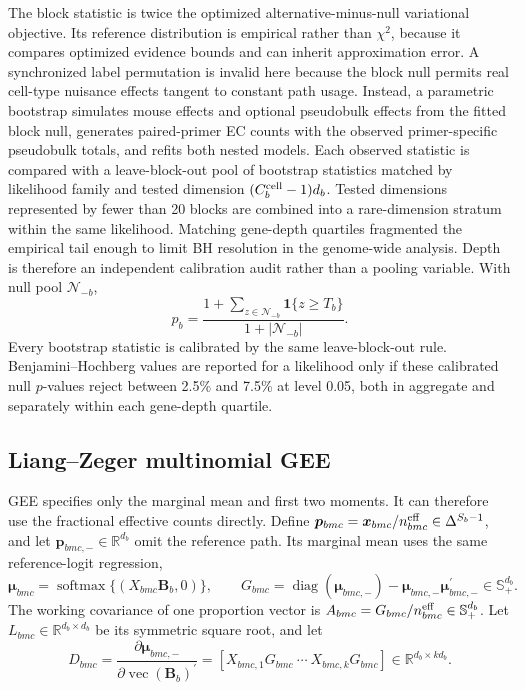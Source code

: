 \documentclass[11pt]{article}
\newcommand{\Beta}{\bm B}
\begin{document}
The block statistic is twice the optimized alternative-minus-null variational objective. Its reference distribution is empirical rather than \(\chi^2\), because it compares optimized evidence bounds and can inherit approximation error. A synchronized label permutation is invalid here because the block null permits real cell-type nuisance effects tangent to constant path usage. Instead, a parametric bootstrap simulates mouse effects and optional pseudobulk effects from the fitted block null, generates paired-primer EC counts with the observed primer-specific pseudobulk totals, and refits both nested models. Each observed statistic is compared with a leave-block-out pool of bootstrap statistics matched by likelihood family and tested dimension \((C_b^{\rm cell}-1)d_b\). Tested dimensions represented by fewer than 20 blocks are combined into a rare-dimension stratum within the same likelihood. Matching gene-depth quartiles fragmented the empirical tail enough to limit BH resolution in the genome-wide analysis. Depth is therefore an independent calibration audit rather than a pooling variable. With null pool \(\mathcal N_{-b}\), \[
 p_b=\frac{1+\sum_{z\in\mathcal N_{-b}}
                   \mathbf1\{z\geq T_b\}}
              {1+|\mathcal N_{-b}|}.
\]
Every bootstrap statistic is calibrated by the same leave-block-out rule. Benjamini--Hochberg values are reported for a likelihood only if these calibrated null \(p\)-values reject between 2.5\% and 7.5\% at level 0.05, both in aggregate and separately within each gene-depth quartile.

\subsection*{Liang--Zeger multinomial GEE}

GEE specifies only the marginal mean and first two moments. It can therefore use the fractional effective counts directly. Define \(\bm p_{bmc}=\bm x_{bmc}/n_{bmc}^{\rm eff}\in\Delta^{S_b-1}\), and let \(\bm p_{bmc,-}\in\mathbb R^{d_b}\) omit the reference path. Its marginal mean uses the same reference-logit regression, \[
 \bm\mu_{bmc}=\operatorname{softmax}\{(X_{bmc}\Beta_b,0)\},
 \qquad
 G_{bmc}=\operatorname{diag}(\bm\mu_{bmc,-})
 -\bm\mu_{bmc,-}\bm\mu_{bmc,-}^\prime
 \in\mathbb S_+^{d_b}.
\]
The working covariance of one proportion vector is \(A_{bmc}=G_{bmc}/n_{bmc}^{\rm eff}\in\mathbb S_+^{d_b}\). Let \(L_{bmc}\in\mathbb R^{d_b\times d_b}\) be its symmetric square root, and let \[
 D_{bmc}=\frac{\partial\bm\mu_{bmc,-}}
 {\partial\operatorname{vec}(\Beta_b)^\prime}
 =[X_{bmc,1}G_{bmc}\ \cdots\ X_{bmc,k}G_{bmc}]
 \in\mathbb R^{d_b\times kd_b}.
\]
\end{document}
